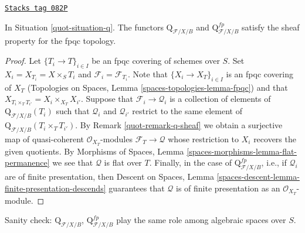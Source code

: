 \begin{lemma}[Q sheaf]
\label{quot-lemma-q-sheaf}
\href{https://stacks.math.columbia.edu/tag/082P}{\texttt{Stacks tag 082P}}

In Situation \ref{quot-situation-q}. The functors
$\text{Q}_{\mathcal{F}/X/B}$ and
$\text{Q}^{fp}_{\mathcal{F}/X/B}$
satisfy the sheaf property for the fpqc topology.
\end{lemma}

\begin{proof}

Let $\{T_i \to T\}_{i \in I}$ be an fpqc covering of schemes over $S$.
Set $X_i = X_{T_i} = X \times_S T_i$ and $\mathcal{F}_i = \mathcal{F}_{T_i}$.
Note that $\{X_i \to X_T\}_{i \in I}$ is an fpqc covering of
$X_T$ (Topologies on Spaces, Lemma \ref{spaces-topologies-lemma-fpqc})
and that $X_{T_i \times_T T_{i'}} = X_i \times_{X_T} X_{i'}$.
Suppose that $\mathcal{F}_i \to \mathcal{Q}_i$ is a collection of
elements of $\text{Q}_{\mathcal{F}/X/B}(T_i)$ such that $\mathcal{Q}_i$
and $\mathcal{Q}_{i'}$ restrict to the same element of
$\text{Q}_{\mathcal{F}/X/B}(T_i \times_T T_{i'})$. By
Remark \ref{quot-remark-q-sheaf}
we obtain a surjective map of quasi-coherent $\mathcal{O}_{X_T}$-modules
$\mathcal{F}_T \to \mathcal{Q}$ whose restriction to $X_i$ recovers
the given quotients.
By Morphisms of Spaces, Lemma \ref{spaces-morphisms-lemma-flat-permanence}
we see that $\mathcal{Q}$ is flat over $T$. Finally, in the case of
$\text{Q}^{fp}_{\mathcal{F}/X/B}$, i.e., if $\mathcal{Q}_i$ are
of finite presentation, then
Descent on Spaces, Lemma
\ref{spaces-descent-lemma-finite-presentation-descends}
guarantees that $\mathcal{Q}$ is of finite presentation as an
$\mathcal{O}_{X_T}$-module.
\end{proof}

Sanity check: $\text{Q}_{\mathcal{F}/X/B}$,
$\text{Q}^{fp}_{\mathcal{F}/X/B}$
play the same role among algebraic spaces
over $S$.

